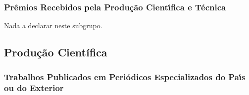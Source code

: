 \documentclass[a4paper,oneside,10pt]{article}
\begin{document}

\subsubsection{Pr\^{e}mios Recebidos pela Produ\c{c}\~{a}o Cient\'{\i}fica e T\'{e}cnica}
\vspace{0.3cm}

Nada a declarar neste subgrupo.





\subsection{Produção Científica}
\vspace{0.3cm}


\subsubsection{Trabalhos Publicados em Peri\'{o}dicos Especializados do Pa\'{\i}s ou do Exterior}
\vspace{0.3cm}
\end{document}
